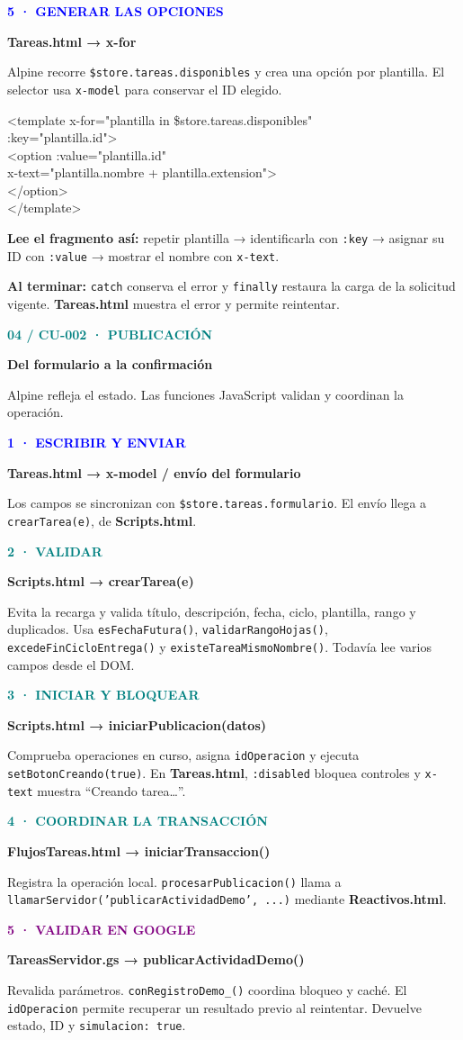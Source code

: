 \documentclass[11pt,a4paper]{article}
\newcommand{\titulo}[3]{\textcolor{teal}{\small\textbf{#1}}\par{\LARGE\bfseries #2}\par\vspace{2mm}#3\par\vspace{3mm}}
\newcommand{\paso}[4]{\begin{tcolorbox}[colback=#1!5!white,colframe=#1!40!white,boxrule=0.5pt,arc=2mm,left=3mm,right=3mm,top=2mm,bottom=2mm]\textcolor{#1}{\textbf{#2}}\par\textbf{#3}\par #4\end{tcolorbox}}
\newcommand{\nota}[2]{\begin{tcolorbox}[colback=amber!8!white,colframe=amber!40!white,boxrule=0.5pt,arc=2mm]\textcolor{amber}{\textbf{#1}} #2\end{tcolorbox}}
\newcommand{\archivo}[1]{\textbf{#1}}
\newcommand{\met}[1]{\texttt{#1}}
\begin{document}
\paso{blue}{5 · GENERAR LAS OPCIONES}{Tareas.html → x-for}{Alpine recorre \met{\$store.tareas.disponibles} y crea una opción por plantilla. El selector usa \met{x-model} para conservar el ID elegido.}
\begin{tcolorbox}[colback=ink,coltext=white,colframe=ink,arc=2mm]
\small\ttfamily
<template x-for="plantilla in \$store.tareas.disponibles"\\
\hspace*{3mm}:key="plantilla.id">\\
\hspace*{3mm}<option :value="plantilla.id"\\
\hspace*{6mm}x-text="plantilla.nombre + plantilla.extension">\\
\hspace*{3mm}</option>\\
</template>
\end{tcolorbox}
\textbf{Lee el fragmento así:} repetir plantilla → identificarla con \met{:key} → asignar su ID con \met{:value} → mostrar el nombre con \met{x-text}.
\nota{Al terminar:}{\met{catch} conserva el error y \met{finally} restaura la carga de la solicitud vigente. \archivo{Tareas.html} muestra el error y permite reintentar.}
\newpage
\titulo{04 / CU-002 · PUBLICACIÓN}{Del formulario a la confirmación}{Alpine refleja el estado. Las funciones JavaScript validan y coordinan la operación.}
\paso{blue}{1 · ESCRIBIR Y ENVIAR}{Tareas.html → x-model / envío del formulario}{Los campos se sincronizan con \met{\$store.tareas.formulario}. El envío llega a \met{crearTarea(e)}, de \archivo{Scripts.html}.}
\paso{teal}{2 · VALIDAR}{Scripts.html → crearTarea(e)}{Evita la recarga y valida título, descripción, fecha, ciclo, plantilla, rango y duplicados. Usa \met{esFechaFutura()}, \met{validarRangoHojas()}, \met{excedeFinCicloEntrega()} y \met{existeTareaMismoNombre()}. Todavía lee varios campos desde el DOM.}
\paso{teal}{3 · INICIAR Y BLOQUEAR}{Scripts.html → iniciarPublicacion(datos)}{Comprueba operaciones en curso, asigna \met{idOperacion} y ejecuta \met{setBotonCreando(true)}. En \archivo{Tareas.html}, \met{:disabled} bloquea controles y \met{x-text} muestra ``Creando tarea…''.}
\paso{teal}{4 · COORDINAR LA TRANSACCIÓN}{FlujosTareas.html → iniciarTransaccion()}{Registra la operación local. \met{procesarPublicacion()} llama a \met{llamarServidor('publicarActividadDemo', ...)} mediante \archivo{Reactivos.html}.}
\paso{purple}{5 · VALIDAR EN GOOGLE}{TareasServidor.gs → publicarActividadDemo()}{Revalida parámetros. \met{conRegistroDemo\_()} coordina bloqueo y caché. El \met{idOperacion} permite recuperar un resultado previo al reintentar. Devuelve estado, ID y \met{simulacion: true}.}
\end{document}
